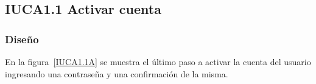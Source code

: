 
\subsection{IUCA1.1 Activar cuenta}

\subsubsection{Diseño}
 En la figura~\ref{IUCA1.1A} se muestra el último paso a activar la cuenta del usuario ingresando una contraseña y una confirmación de la misma.


